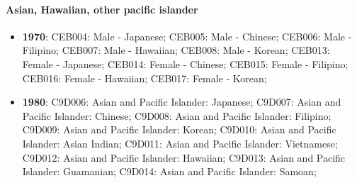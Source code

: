 \documentclass[a4paper]{article}
\begin{document}
\paragraph{Asian, Hawaiian, other pacific islander}
\begin{itemize}
   \item{\textbf{1970}:  CEB004: Male - Japanese; CEB005: Male - Chinese; CEB006: Male - Filipino; CEB007: Male - Hawaiian; CEB008: Male - Korean; CEB013: Female - Japanese; CEB014: Female - Chinese; CEB015: Female - Filipino; CEB016: Female - Hawaiian; CEB017: Female - Korean;}
   \item{\textbf{1980}:  C9D006: Asian and Pacific Islander: Japanese; C9D007: Asian and Pacific Islander: Chinese; C9D008: Asian and Pacific Islander: Filipino; C9D009: Asian and Pacific Islander: Korean; C9D010: Asian and Pacific Islander: Asian Indian; C9D011: Asian and Pacific Islander: Vietnamese; C9D012: Asian and Pacific Islander: Hawaiian; C9D013: Asian and Pacific Islander: Guamanian; C9D014: Asian and Pacific Islander: Samoan;}

\end{itemize}
\end{document}
